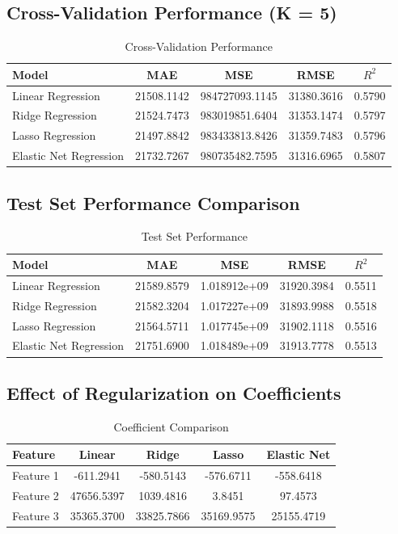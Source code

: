 \documentclass[11pt]{article}
\begin{document}
\subsection*{Cross-Validation Performance (K = 5)}
\begin{table}[h!]
\centering
\renewcommand{\arraystretch}{1.3}
\caption{Cross-Validation Performance}
\begin{tabular}{|l|c|c|c|c|}
\hline
Model & MAE & MSE & RMSE & $R^2$ \\ \hline
Linear Regression & 21508.1142 & 984727093.1145 & 31380.3616 & 0.5790 \\
Ridge Regression & 21524.7473 & 983019851.6404 & 31353.1474 & 0.5797 \\
Lasso Regression & 21497.8842 & 983433813.8426 & 31359.7483 & 0.5796 \\
Elastic Net Regression & 21732.7267 & 980735482.7595 & 31316.6965 & 0.5807 \\ \hline
\end{tabular}
\end{table}

\subsection*{Test Set Performance Comparison}
\begin{table}[h!]
\centering
\renewcommand{\arraystretch}{1.3}
\caption{Test Set Performance}
\begin{tabular}{|l|c|c|c|c|}
\hline
Model & MAE & MSE & RMSE & $R^2$ \\ \hline
Linear Regression & 21589.8579 & 1.018912e+09 & 31920.3984 & 0.5511 \\
Ridge Regression & 21582.3204 & 1.017227e+09 & 31893.9988 & 0.5518 \\
Lasso Regression & 21564.5711 & 1.017745e+09 & 31902.1118 & 0.5516 \\
Elastic Net Regression & 21751.6900 & 1.018489e+09 & 31913.7778 & 0.5513 \\ \hline
\end{tabular}
\end{table}

\subsection*{Effect of Regularization on Coefficients}
\begin{table}[H]
\centering
\renewcommand{\arraystretch}{1.3}
\caption{Coefficient Comparison}
\begin{tabular}{|l|c|c|c|c|}
\hline
Feature & Linear & Ridge & Lasso & Elastic Net \\ \hline
Feature 1 & -611.2941 & -580.5143 & -576.6711 & -558.6418 \\
Feature 2 & 47656.5397 & 1039.4816 & 3.8451 & 97.4573 \\
Feature 3 & 35365.3700 & 33825.7866 & 35169.9575 & 25155.4719 \\ \hline
\end{tabular}
\end{table}
\end{document}
